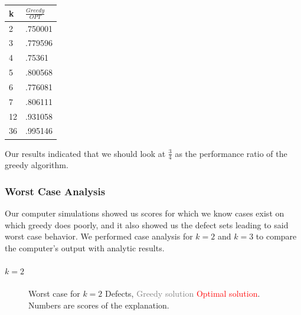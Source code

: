 \begin{tabular}{l|l}
k & $\frac{Greedy}{OPT}$ \\ \hline
 2 & .750001  \\
 3 & .779596  \\
 4 & .75361   \\
 5 & .800568  \\
 6 & .776081  \\
 7 & .806111  \\
12 & .931058  \\
36 & .995146  \\
\end{tabular}

Our results indicated that we should look at $\frac34$ as the performance ratio of the greedy algorithm.

\subsubsection{Worst Case Analysis}

Our computer simulations showed us scores for which we know cases exist on which greedy does poorly, and it also showed us the defect sets leading to said worst case behavior.  We performed case analysis for $k=2$ and $k=3$ to compare the computer's output with analytic results.

\paragraph{\textbf{$k=2$}} 

\begin{figure}[ht!] \centering
{} 
\caption{Worst case for $k=2$ Defects, \textcolor{gray}{Greedy solution} \textcolor{red}{Optimal solution}.  Numbers are scores of the explanation.}
\label{fig:k2}
\end{figure}

